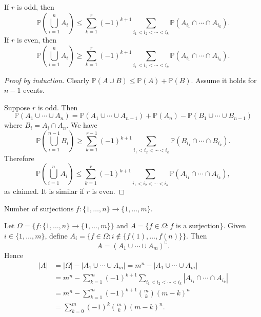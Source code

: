 \begin{proposition}\label{prop:Bonferroni inequalities}
    If $r$ is odd, then 
    \[
        \mathbb{P}\left( \bigcup_{i=1}^{n}A_i \right)\le \sum_{k=1}^{r}(-1)^{k+1} \sum_{i_1<i_2<\cdots<i_k}\mathbb{P}\left( A_{i_1}\cap \cdots \cap A_{i_k} \right).
    \]
    If $r$ is even, then 
    \[
        \mathbb{P}\left( \bigcup_{i=1}^{n}A_i \right)\ge \sum_{k=1}^{r}(-1)^{k+1} \sum_{i_1<i_2<\cdots<i_k}\mathbb{P}\left( A_{i_1}\cap \cdots \cap A_{i_k} \right).
    \]
\end{proposition}
\begin{proof}[Proof by induction]
    Clearly $ \mathbb{P}(A \cup B)\le \mathbb{P}(A)+\mathbb{P}(B) $. Assume it holds for $n-1$ events.

    Suppose $r$ is odd. Then 
    \[
        \mathbb{P}(A_1 \cup \cdots \cup A_n) = \mathbb{P}(A_1 \cup \cdots \cup A_{n-1})+\mathbb{P}(A_n)-\mathbb{P}(B_1 \cup \cdots \cup B_{n-1})
    \]
    where $ B_i=A_i\cap A_n $. We have 
    \[
        \mathbb{P}\left( \bigcup_{i=1}^{n-1}B_i \right)\ge \sum_{k=1}^{r-1}(-1)^{k+1} \sum_{i_1<i_2<\cdots<i_k}\mathbb{P}\left( B_{i_1}\cap \cdots \cap B_{i_k} \right).
    \]
    Therefore 
    \[
        \mathbb{P}\left( \bigcup_{i=1}^{n}A_i \right)\le \sum_{k=1}^{r}(-1)^{k+1} \sum_{i_1<i_2<\cdots<i_k}\mathbb{P}\left( A_{i_1}\cap \cdots \cap A_{i_k} \right),
    \]
    as claimed. It is similar if $r$ is even.
\end{proof}

\begin{example}
    Number of surjections $ f: \{1,\dots,n\}\to \{1,\dots,m\} $.

    Let $ \Omega = \{f: \{1,\dots,n\}\to \{1,\dots,m\}\} $ and $ A=\{f\in \Omega: f \text{ is a surjection}\} $. Given $ i\in \{1,\dots,m\} $, define $ A_i=\{f\in\Omega: i\notin \{f(1),\dots,f(n)\}\} $. Then 
    \[
        A = (A_1 \cup \cdots \cup A_m)^{\complement}.
    \]
    Hence 
    \begin{align*}
        |A|&= |\Omega|-|A_1 \cup \cdots \cup A_m|=m^n-|A_1 \cup \cdots \cup A_m|\\ 
        &= m^n-\sum_{k=1}^{m}(-1)^{k+1} \sum_{i_1<i_2<\cdots<i_k}\left| A_{i_1}\cap \cdots \cap A_{i_k} \right|\\ 
        &= m^n-\sum_{k=1}^{m}(-1)^{k+1} \binom{m}{k}(m-k)^n\\ 
        &= \sum_{k=0}^{m}(-1)^k \binom{m}{k}(m-k)^n.
    \end{align*}
\end{example}